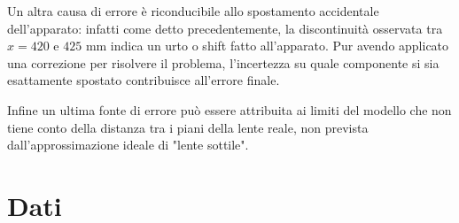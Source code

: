 \documentclass[10pt,twocolumn]{article}
\begin{document}
\noindent Un altra causa di errore è riconducibile allo spostamento accidentale dell'apparato: infatti come detto precedentemente, la discontinuità osservata tra $x=420$ e $425$ mm indica un urto o shift fatto all'apparato. Pur avendo applicato una correzione per risolvere il problema, l'incertezza su quale componente si sia esattamente spostato contribuisce all'errore finale.

\noindent Infine un ultima fonte di errore può essere attribuita ai limiti del modello che non tiene conto della distanza tra i piani della lente reale, non prevista dall'approssimazione ideale di "lente sottile". 


    
\onecolumn
\section{Dati}
    
\footnotesize
\end{document}

